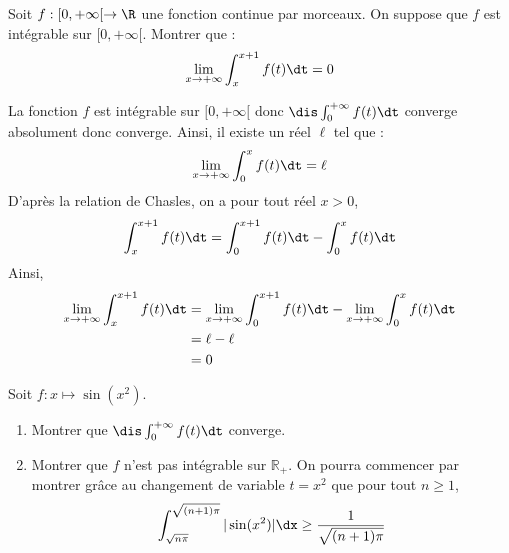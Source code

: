 \documentclass[a4paper,10pt]{report}
\begin{document}
\begin{Exercice}{}  Soit $f :[0, + \infty[ \rightarrow \R$ une fonction continue par morceaux.  On suppose que $f$ est intégrable sur $[0, + \infty[$.  Montrer que :
  \[
  \lim_{x \rightarrow + \infty} \int_{x}^{x + 1} f(t) \dt =0 
  \]
\end{Exercice}

\corr La fonction $f$ est intégrable sur $[0, + \infty[$ donc $\dis \int_0^{+ \infty} f(t) \dt$ converge absolument donc converge. Ainsi, il existe un réel $\ell$ tel que :
$$ \lim_{x \rightarrow + \infty} \int_0^x f(t) \dt = \ell$$
D'après la relation de Chasles, on a pour tout réel $x>0$,
$$ \int_{x}^{x + 1} f(t) \dt = \int_{0}^{x + 1} f(t) \dt - \int_{0}^{x} f(t) \dt $$
Ainsi,
\begin{align*}
\lim_{x \rightarrow + \infty} \int_{x}^{x + 1} f(t) \dt & =\lim_{x \rightarrow + \infty}  \int_{0}^{x + 1} f(t) \dt - \lim_{x \rightarrow + \infty} \int_{0}^{x} f(t) \dt \\
& = \ell - \ell \\
& = 0
\end{align*}

\begin{Exercice}{}
Soit $f : x \mapsto \sin(x^2)$.
\begin{enumerate}
\item Montrer que $\dis \int_{0}^{+ \infty}  f(t) \dt$ converge.
\item Montrer que $f$ n'est pas intégrable sur $\mathbb{R}_+$. On pourra commencer par montrer grâce au changement de variable $t=x^2$ que pour tout $n \geq 1$,
$$ \int_{\sqrt{n \pi}}^{\sqrt{(n+1)\pi}} \vert \sin(x^2) \vert \dx \geq \frac{1}{\sqrt{(n+1) \pi}}$$
\end{enumerate}
\end{Exercice}

\corr 
\end{document}
